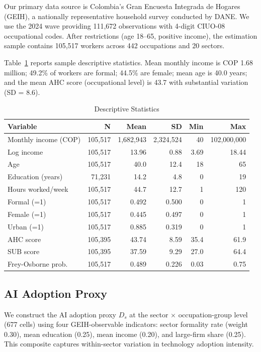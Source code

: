 \documentclass[a4paper,fleqn]{cas-dc}
\begin{document}
Our primary data source is Colombia's Gran Encuesta Integrada de Hogares (GEIH), a nationally representative household survey conducted by DANE. We use the 2024 wave providing 111,672 observations with 4-digit CIUO-08 occupational codes. After restrictions (age 18--65, positive income), the estimation sample contains 105,517 workers across 442 occupations and 20 sectors.

Table~\ref{tab:descriptives} reports sample descriptive statistics. Mean monthly income is COP 1.68 million; 49.2\% of workers are formal; 44.5\% are female; mean age is 40.0 years; and the mean AHC score (occupational level) is 43.7 with substantial variation (SD = 8.6).

\begin{table}[width=.9\linewidth,cols=6,pos=h]
\caption{Descriptive Statistics}\label{tab:descriptives}
\begin{tabular*}{\tblwidth}{@{} lrrrrr @{}}
\toprule
Variable & N & Mean & SD & Min & Max \\
\midrule
Monthly income (COP) & 105,517 & 1,682,943 & 2,324,524 & 40 & 102,000,000 \\
Log income & 105,517 & 13.96 & 0.88 & 3.69 & 18.44 \\
Age & 105,517 & 40.0 & 12.4 & 18 & 65 \\
Education (years) & 71,231 & 14.2 & 4.8 & 0 & 19 \\
Hours worked/week & 105,517 & 44.7 & 12.7 & 1 & 120 \\
Formal (=1) & 105,517 & 0.492 & 0.500 & 0 & 1 \\
Female (=1) & 105,517 & 0.445 & 0.497 & 0 & 1 \\
Urban (=1) & 105,517 & 0.885 & 0.319 & 0 & 1 \\
\midrule
AHC score & 105,395 & 43.74 & 8.59 & 35.4 & 61.9 \\
SUB score & 105,395 & 37.59 & 9.29 & 27.0 & 64.4 \\
Frey-Osborne prob. & 105,517 & 0.489 & 0.226 & 0.03 & 0.75 \\
\bottomrule
\end{tabular*}
\end{table}

\subsection{AI Adoption Proxy}

We construct the AI adoption proxy $D_s$ at the sector $\times$ occupation-group level (677 cells) using four GEIH-observable indicators: sector formality rate (weight 0.30), mean education (0.25), mean income (0.20), and large-firm share (0.25). This composite captures within-sector variation in technology adoption intensity.
\end{document}
